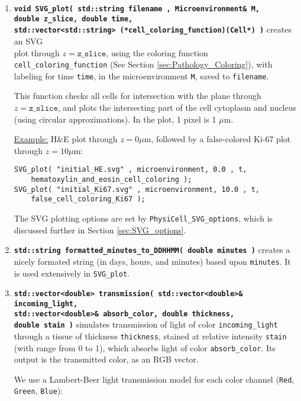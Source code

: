 \documentclass[12pt]{article}
\newcommand{\micron}{\mu\textrm{m}}
\renewcommand{\v}{\verb}
\newcommand{\smallcode}[1]{\textbf{\texttt{#1}}}
\begin{document}
\begin{enumerate}
\item 
\smallcode{void SVG\_plot( std::string filename , Microenvironment\& M, \\
\phantom{void }double z\_slice, double time, \\ 
\phantom{void }std::vector<std::string> (*cell\_coloring\_function)(Cell*) )} 
creates an SVG \\
plot through $z = \texttt{z\_slice}$, 
using the coloring function 
\v|cell_coloring_function| (See Section 
\ref{sec:Pathology_Coloring}), with labeling for time 
\v|time|, in the microenvironment \v|M|, saved to \v|filename|. 

This function checks all cells for intersection with the plane through 
$z = \texttt{z\_slice}$, and plots the intersecting part of the cell cytoplasm 
and nucleus (using circular approximations). In the plot, 1 pixel is 1 $\micron$. 

\underline{Example:} H\&E plot through $z = 0 \micron$, followed 
by a false-colored Ki-67 plot through $z = 10 \micron$: %
\begin{verbatim}
SVG_plot( "initial_HE.svg" , microenvironment, 0.0 , t, 
    hematoxylin_and_eosin_cell_coloring );
SVG_plot( "initial_Ki67.svg" , microenvironment, 10.0 , t, 
    false_cell_coloring_Ki67 );
\end{verbatim}

The SVG plotting options are set by \v|PhysiCell_SVG_options|, which is 
discussed further in Section \ref{sec:SVG_options}.

\item 
\smallcode{std::string formatted\_minutes\_to\_DDHHMM( double minutes )} 
creates a nicely formated string (in days, hours, and minutes) based upon 
\v|minutes|. It is used extensively in \v|SVG_plot|.  

\item 
\smallcode{std::vector<double> transmission( std::vector<double>\& incoming\_light, \\
\phantom{std::vector<double> }std::vector<double>\& absorb\_color, double thickness, \\
\phantom{std::vector<double> }double stain )} simulates transmission of light 
of color \v|incoming_light| through a tissue of thickness 
\v|thickness|, stained at relative intensity \v|stain| (with range from 0 to 1), 
which absorbs light of color \v|absorb_color|. Its output is the transmitted color, as 
an RGB vector.  

We use a Lambert-Beer \cite{ref:lambert_beer} light transmission model 
for each color channel (\v|Red|, \v|Green|, \v|Blue|): 


\end{enumerate}
\end{document}
